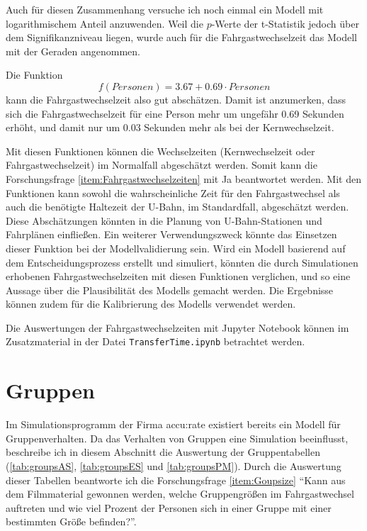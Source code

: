 Auch für diesen Zusammenhang versuche ich noch einmal ein Modell mit logarithmischem Anteil anzuwenden. Weil die $p$-Werte der t-Statistik jedoch über dem Signifikanzniveau liegen, wurde auch für die Fahrgastwechselzeit das Modell mit der Geraden angenommen.

Die Funktion 
\begin{equation}
f(Personen) = 3.67 + 0.69 \cdot Personen 
\end{equation}  
kann die Fahrgastwechselzeit also gut abschätzen. Damit ist anzumerken, dass sich die Fahrgastwechselzeit für eine Person mehr um ungefähr 0.69 Sekunden erhöht, und damit nur um 0.03 Sekunden mehr als bei der Kernwechselzeit.

Mit diesen Funktionen können die Wechselzeiten (Kernwechselzeit oder Fahrgastwechselzeit) im Normalfall abgeschätzt werden. Somit kann die Forschungsfrage \ref{item:Fahrgastwechselzeiten} mit Ja beantwortet werden. Mit den Funktionen kann sowohl die wahrscheinliche Zeit für den Fahrgastwechsel als auch die benötigte Haltezeit der U-Bahn, im Standardfall, abgeschätzt werden. Diese Abschätzungen könnten in die Planung von U-Bahn-Stationen und Fahrplänen einfließen. Ein weiterer Verwendungszweck könnte das Einsetzen dieser Funktion bei der Modellvalidierung sein. Wird ein Modell basierend auf dem Entscheidungsprozess erstellt und simuliert, könnten die durch Simulationen erhobenen Fahrgastwechselzeiten mit diesen Funktionen verglichen, und so eine Aussage über die Plausibilität des Modells gemacht werden. Die Ergebnisse können zudem für die Kalibrierung des Modells verwendet werden. 

Die Auswertungen der Fahrgastwechselzeiten mit \textsf{Jupyter Notebook} können im Zusatzmaterial in der Datei \texttt{TransferTime.ipynb} betrachtet werden.
\section{Gruppen} \label{Gruppen}
Im Simulationsprogramm der Firma accu:rate existiert bereits ein Modell für Gruppenverhalten. Da das Verhalten von Gruppen eine Simulation beeinflusst, beschreibe ich in diesem Abschnitt die Auswertung der Gruppentabellen (\tablename \ref{tab:groupsAS}, \tablename \ref{tab:groupsES} und \tablename \ref{tab:groupsPM}). Durch die Auswertung dieser Tabellen beantworte ich die Forschungsfrage \ref{item:Goupsize} "`Kann aus dem Filmmaterial gewonnen werden, welche Gruppengrößen im Fahrgastwechsel auftreten und wie viel Prozent der Personen sich in einer Gruppe mit einer bestimmten Größe befinden?"'.

